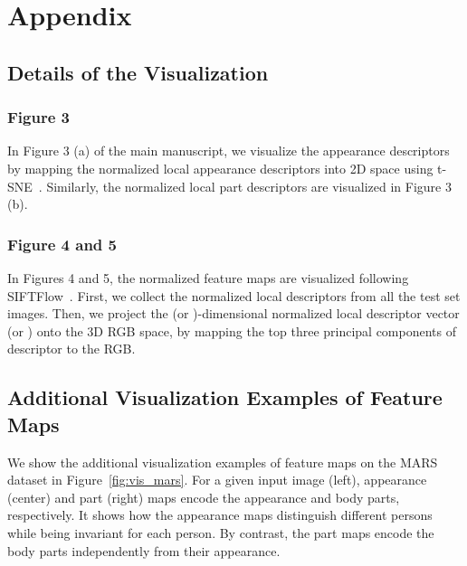 \documentclass{llncs}
\begin{document}
\appendix
\section{Appendix}

\subsection{Details of the Visualization}
\subsubsection{Figure 3} In Figure 3 (a) of the main manuscript, we visualize the appearance descriptors by mapping the normalized local appearance descriptors  into 2D space using t-SNE~\cite{tsne}. Similarly, the normalized local part descriptors  are visualized in Figure 3 (b).
\subsubsection{Figure 4 and 5} In Figures 4 and 5, the normalized feature maps are visualized following SIFTFlow~\cite{siftflow}. {\color{black} First, we collect the normalized local descriptors from all the test set images.} Then, we project the (or )-dimensional normalized local descriptor vector (or ) onto the 3D RGB space, by mapping the top three principal components of descriptor to the RGB. 


\subsection{Additional Visualization Examples of Feature Maps}
We show the additional visualization examples of feature maps on the MARS dataset in Figure~\ref{fig:vis_mars}.
For a given input image (left), appearance (center) and part (right) maps encode the appearance and body parts, respectively.
It shows how the appearance maps distinguish different persons while being invariant for each person. By contrast, the part maps encode the body parts independently from their appearance.
\end{document}
